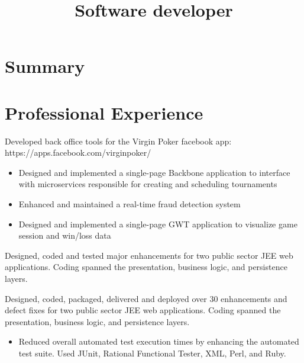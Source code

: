\documentclass[11pt,letterpaper,sans]{moderncv}   %
\title{Software developer}               %
\begin{document}
\maketitle

\section{Summary}

\section{Professional Experience}
{Developed back office tools for the Virgin Poker facebook app: https://apps.facebook.com/virginpoker/
{\begin{itemize}
\item Designed and implemented a single-page Backbone application to interface with microservices responsible for
creating and scheduling tournaments
\item Enhanced and maintained a real-time fraud detection system
\item Designed and implemented a single-page GWT application to visualize game session and win/loss data
\end{itemize}}}
\smallskip

{Designed, coded and tested major enhancements for two public sector
JEE web applications.
Coding spanned the presentation, business logic, and persistence layers.}
\smallskip

{Designed, coded, packaged, delivered and deployed over 30 enhancements
and defect fixes for two public sector JEE web applications.
Coding spanned the presentation, business logic, and persistence layers.
{\begin{itemize}
\item 
Reduced overall automated test execution times by enhancing the automated test suite.
Used JUnit, Rational Functional Tester, XML, Perl, and Ruby.
\end{itemize}}}
\smallskip
\end{document}
